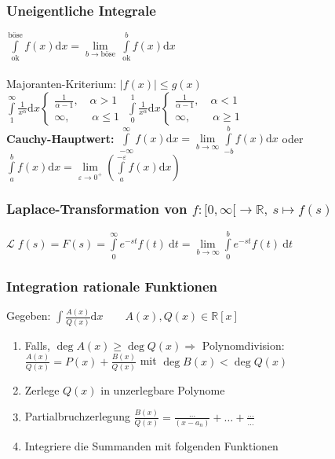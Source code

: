 \documentclass[6pt,a4paper]{scrartcl}
\newcommand{\enbrace}[1]{\ensuremath{\left(#1\right)}}
\newcommand{\Ra}[0]{\ensuremath{\Rightarrow}}
\newcommand{\ra}[0]{\ensuremath{\rightarrow}}
\begin{document}
\begin{multicols*}{4}
\subsubsection{Uneigentliche Integrale}
$\int\limits_{\text{ok}}^{\text{böse}} f(x) \mathrm dx = \lim\limits_{b\rightarrow \text{böse}}\ \int\limits_{\text{ok}}^b f(x) \mathrm dx$\\
\\
Majoranten-Kriterium: $|f(x)|\le g(x)$\\
$\int\limits_{1}^{\infty} \frac{1}{x^\alpha} \mathrm dx \begin{cases} \frac{1}{\alpha -1}, \quad \alpha > 1 \\ \infty, \qquad \alpha \le 1 \end{cases}$ \qquad
$\int\limits_{0}^{1} \frac{1}{x^\alpha} \mathrm dx \begin{cases} \frac{1}{\alpha -1}, \quad \alpha < 1 \\ \infty, \qquad \alpha \ge 1 \end{cases}$\\
\textbf{Cauchy-Hauptwert:} $\int\limits_{-\infty}^{\infty} f(x) \mathrm dx = \lim\limits_{b\rightarrow\infty} \int\limits_{-b}^b f(x) \mathrm dx$ oder\\
$\int\limits_{a}^{b} f(x) \mathrm dx=\lim\limits_{\varepsilon \rightarrow 0^+}\enbrace{\int\limits_{a}^{-\varepsilon} f(x) \mathrm dx}$

\subsubsection{Laplace-Transformation von $f: [0,\infty[ \ra \mathbb R,\ s \mapsto f(s)$}
$\mathcal L \; f(s) = F(s) = \int\limits_{0}^{\infty} e^{-st} f(t)\ \mathrm dt = \lim\limits_{b \ra \infty} \int\limits_{0}^{b} e^{-st} f(t)\ \mathrm dt$

\subsubsection{Integration rationale Funktionen}
Gegeben: $\int \frac{A(x)}{Q(x)} \mathrm dx \qquad A(x),Q(x)\in \mathbb R[x]$
\begin{enumerate}\itemsep0pt
\item Falls, $\deg A(x) \ge \deg Q(x) \Ra$ Polynomdivision: \\ $\frac{A(x)}{Q(x)} = P(x) + \frac{B(x)}{Q(x)}$ mit $\deg B(x) < \deg Q(x)$
\item Zerlege $Q(x)$ in unzerlegbare Polynome
\item Partialbruchzerlegung $\frac{B(x)}{Q(x)} = \frac{\ldots}{(x - a_n)} + \ldots + \frac{\ldots}{\ldots}$
\item Integriere die Summanden mit folgenden Funktionen
\end{enumerate}


\end{multicols*}
\end{document}
